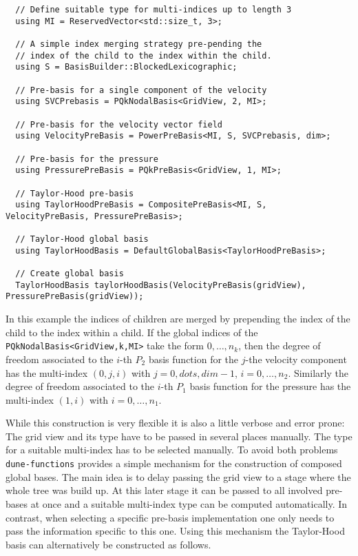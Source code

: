 \documentclass[a4paper,10pt,headings=normal,bibliography=totoc]{scrartcl}
\newcommand{\cpp}[1]{\lstinline[basicstyle=\ttfamily]!#1!}
\newcommand{\dunemodule}[1]{\texttt{#1}}
\begin{document}
\begin{lstlisting}
  // Define suitable type for multi-indices up to length 3
  using MI = ReservedVector<std::size_t, 3>;

  // A simple index merging strategy pre-pending the
  // index of the child to the index within the child.
  using S = BasisBuilder::BlockedLexicographic;

  // Pre-basis for a single component of the velocity
  using SVCPrebasis = PQkNodalBasis<GridView, 2, MI>;

  // Pre-basis for the velocity vector field
  using VelocityPreBasis = PowerPreBasis<MI, S, SVCPrebasis, dim>;

  // Pre-basis for the pressure
  using PressurePreBasis = PQkPreBasis<GridView, 1, MI>;

  // Taylor-Hood pre-basis
  using TaylorHoodPreBasis = CompositePreBasis<MI, S, VelocityPreBasis, PressurePreBasis>;

  // Taylor-Hood global basis
  using TaylorHoodBasis = DefaultGlobalBasis<TaylorHoodPreBasis>;

  // Create global basis
  TaylorHoodBasis taylorHoodBasis(VelocityPreBasis(gridView), PressurePreBasis(gridView));
\end{lstlisting}

In this example the indices of children are merged by prepending
the index of the child to the index within a child. If the global
indices of the \cpp{PQkNodalBasis<GridView,k,MI>} take the form
$0,\dots,n_k$, then the degree of freedom associated to the
$i$-th $P_2$ basis function for the $j$-the velocity component
has the multi-index $(0,j,i)$ with $j=0,dots,dim-1$, $i=0,\dots,n_2$.
Similarly the degree of freedom associated to the $i$-th $P_1$
basis function for the pressure has the multi-index $(1,i)$
with $i=0,\dots,n_1$.

While this construction is very flexible it is also a little
verbose and error prone: The grid view and its type have to
be passed in several places manually. The type for a suitable
multi-index has to be selected manually. To avoid both problems
\dunemodule{dune-functions} provides a simple mechanism for
the construction of composed global bases. The main idea is
to delay passing the grid view to a stage where the whole tree
was build up. At this later stage it can be passed to all
involved pre-bases at once and a suitable multi-index type
can be computed automatically. In contrast, when selecting
a specific pre-basis implementation one only needs to pass
the information specific to this one.
Using this mechanism the Taylor-Hood basis can alternatively
be constructed as follows.
\end{document}
